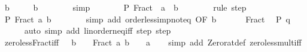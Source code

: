 \begin{isabellebody}
\ b\ \isamarkupfalse%
\ {\isachardoublequoteopen}{}\ {\isacharless}{\kern0pt}\ {\isacharminus}{\kern0pt}\ b{\isachardoublequoteclose}\isanewline
\ \ \ \ \ \ \isamarkupfalse%
\ simp\isanewline
\ \ \ \ \isamarkupfalse%
\ \isamarkupfalse%
\ {\isachardoublequoteopen}P\ {\isacharparenleft}{\kern0pt}Fract\ {\isacharparenleft}{\kern0pt}{\isacharminus}{\kern0pt}\ a{\isacharparenright}{\kern0pt}\ {\isacharparenleft}{\kern0pt}{\isacharminus}{\kern0pt}\ b{\isacharparenright}{\kern0pt}{\isacharparenright}{\kern0pt}{\isachardoublequoteclose}\isanewline
\ \ \ \ \ \ \isamarkupfalse%
\ {\isacharparenleft}{\kern0pt}rule\ step{\isacharparenright}{\kern0pt}\isanewline
\ \ \ \ \isamarkupfalse%
\ \isamarkupfalse%
\ {\isachardoublequoteopen}P\ {\isacharparenleft}{\kern0pt}Fract\ a\ b{\isacharparenright}{\kern0pt}{\isachardoublequoteclose}\isanewline
\ \ \ \ \ \ \isamarkupfalse%
\ {\isacharparenleft}{\kern0pt}simp\ add{\isacharcolon}{\kern0pt}\ order{\isacharunderscore}{\kern0pt}less{\isacharunderscore}{\kern0pt}imp{\isacharunderscore}{\kern0pt}not{\isacharunderscore}{\kern0pt}eq\ {\isacharbrackleft}{\kern0pt}OF\ b{\isacharbrackright}{\kern0pt}{\isacharparenright}{\kern0pt}\isanewline
\ \ \isamarkupfalse%
\isanewline
\ \ \isamarkupfalse%
\ Fract\ \isamarkupfalse%
\ {\isachardoublequoteopen}P\ q{\isachardoublequoteclose}\isanewline
\ \ \ \ \isamarkupfalse%
\ {\isacharparenleft}{\kern0pt}auto\ simp\ add{\isacharcolon}{\kern0pt}\ linorder{\isacharunderscore}{\kern0pt}neq{\isacharunderscore}{\kern0pt}iff\ step\ step{\isacharprime}{\kern0pt}{\isacharparenright}{\kern0pt}\isanewline
{}\isamarkupfalse%
%
\endisatagproof
{\isafoldproof}%
%
\isadelimproof
\isanewline
%
\endisadelimproof
\isanewline
{}\isamarkupfalse%
\ zero{\isacharunderscore}{\kern0pt}less{\isacharunderscore}{\kern0pt}Fract{\isacharunderscore}{\kern0pt}iff{\isacharcolon}{\kern0pt}\ {\isachardoublequoteopen}{}\ {\isacharless}{\kern0pt}\ b\ {\isasymLongrightarrow}\ {}\ {\isacharless}{\kern0pt}\ Fract\ a\ b\ {\isasymlongleftrightarrow}\ {}\ {\isacharless}{\kern0pt}\ a{\isachardoublequoteclose}\isanewline
%
\isadelimproof
\ \ %
\endisadelimproof
%
\isatagproof
{}\isamarkupfalse%
\ {\isacharparenleft}{\kern0pt}simp\ add{\isacharcolon}{\kern0pt}\ Zero{\isacharunderscore}{\kern0pt}rat{\isacharunderscore}{\kern0pt}def\ zero{\isacharunderscore}{\kern0pt}less{\isacharunderscore}{\kern0pt}mult{\isacharunderscore}{\kern0pt}iff{\isacharparenright}{\kern0pt}%

\end{isabellebody}
